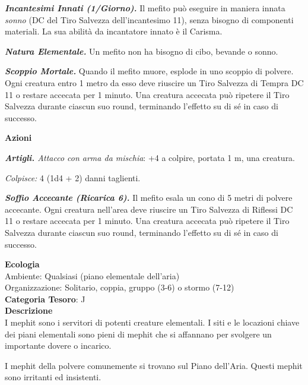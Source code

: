 \begin{multicols}{2}
{\emph{\textbf{Incantesimi Innati (1/Giorno).}} Il mefito può eseguire in maniera innata \emph{sonno} (DC del Tiro Salvezza dell'incantesimo 11), senza bisogno di componenti materiali. La sua abilità da incantatore innato è il Carisma.

\emph{\textbf{Natura Elementale.}} Un mefito non ha bisogno di cibo, bevande o sonno.

\emph{\textbf{Scoppio Mortale.}} Quando il mefito muore, esplode in uno scoppio di polvere. Ogni creatura entro 1 metro da esso deve riuscire un Tiro Salvezza di Tempra DC 11 o restare accecata per 1 minuto. Una creatura accecata può ripetere il Tiro Salvezza durante ciascun suo round, terminando l'effetto su di sé in caso di successo.

\textbf{Azioni}

\emph{\textbf{Artigli.} Attacco con arma da mischia}: +4 a colpire, portata 1 m, una creatura.

\emph{Colpisce:} 4 (1d4 + 2) danni taglienti.

\emph{\textbf{Soffio Accecante (Ricarica 6).}} Il mefito esala un cono di 5 metri di polvere accecante. Ogni creatura nell'area deve riuscire un Tiro Salvezza di Riflessi DC 11 o restare accecata per 1 minuto. Una creatura accecata può ripetere il Tiro Salvezza durante ciascun suo round, terminando l'effetto su di sé in caso di successo.

\textbf{Ecologia}\\
Ambiente: Qualsiasi (piano elementale dell'aria)\\
Organizzazione: Solitario, coppia, gruppo (3-6) o stormo (7-12)\\
\textbf{Categoria Tesoro}: J\\
\textbf{Descrizione}\\
I mephit sono i servitori di potenti creature elementali. I siti e le locazioni chiave dei piani elementali sono pieni di mephit che si affannano per svolgere un importante dovere o incarico.

I mephit della polvere comunemente si trovano sul Piano dell'Aria. Questi mephit sono irritanti ed insistenti.

}
\end{multicols}
